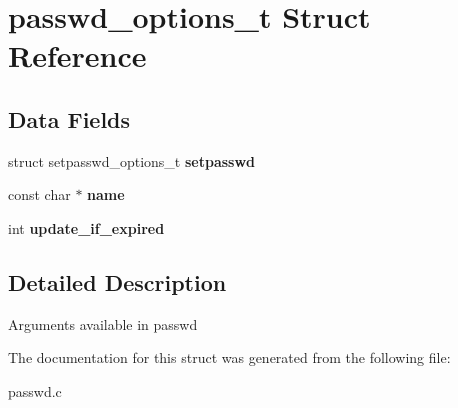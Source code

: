 \hypertarget{structpasswd__options__t}{
\section{passwd\_\-options\_\-t Struct Reference}
\label{structpasswd__options__t}
}
\subsection*{Data Fields}
\begin{DoxyCompactItemize}
\item 
\hypertarget{structpasswd__options__t_a5d0ca7fca7896af46b0b1e7104625e32}{
struct setpasswd\_\-options\_\-t {\bfseries setpasswd}}
\label{structpasswd__options__t_a5d0ca7fca7896af46b0b1e7104625e32}

\item 
\hypertarget{structpasswd__options__t_a8f8f80d37794cde9472343e4487ba3eb}{
const char $\ast$ {\bfseries name}}
\label{structpasswd__options__t_a8f8f80d37794cde9472343e4487ba3eb}

\item 
\hypertarget{structpasswd__options__t_af47876856b78409d608c6e6a886c352c}{
int {\bfseries update\_\-if\_\-expired}}
\label{structpasswd__options__t_af47876856b78409d608c6e6a886c352c}

\end{DoxyCompactItemize}


\subsection{Detailed Description}
Arguments available in passwd 

The documentation for this struct was generated from the following file:\begin{DoxyCompactItemize}
\item 
passwd.c\end{DoxyCompactItemize}
